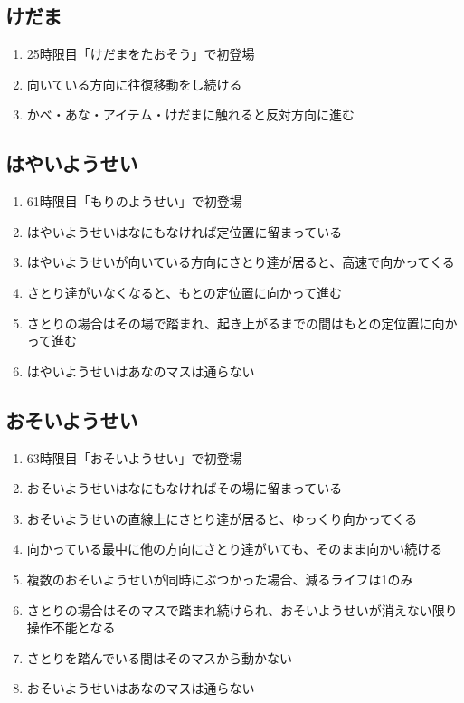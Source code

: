\subsection{けだま}
\begin{enumerate}[label={\sarrow}]
\item 25時限目「けだまをたおそう」で初登場
\item 向いている方向に往復移動をし続ける
\item かべ・あな・アイテム・けだまに触れると反対方向に進む
\end{enumerate}


\subsection{はやいようせい}
\begin{enumerate}[label={\sarrow}]
\item 61時限目「もりのようせい」で初登場
\item はやいようせいはなにもなければ定位置に留まっている
\item はやいようせいが向いている方向にさとり達が居ると、高速で向かってくる
\item さとり達がいなくなると、もとの定位置に向かって進む
\item さとりの場合はその場で踏まれ、起き上がるまでの間はもとの定位置に向かって進む
\item はやいようせいはあなのマスは通らない
\end{enumerate}


\subsection{おそいようせい}
\begin{enumerate}[label={\sarrow}]
\item 63時限目「おそいようせい」で初登場
\item おそいようせいはなにもなければその場に留まっている
\item おそいようせいの直線上にさとり達が居ると、ゆっくり向かってくる
\item 向かっている最中に他の方向にさとり達がいても、そのまま向かい続ける
\item 複数のおそいようせいが同時にぶつかった場合、減るライフは1のみ
\item さとりの場合はそのマスで踏まれ続けられ、おそいようせいが消えない限り操作不能となる
\item さとりを踏んでいる間はそのマスから動かない
\item おそいようせいはあなのマスは通らない
\end{enumerate}


